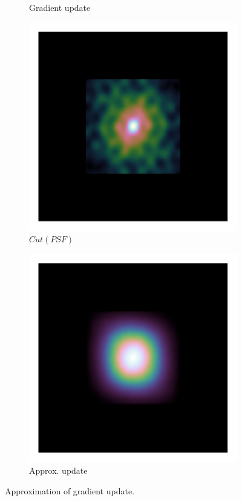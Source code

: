 \begin{figure}[h]
\begin{subfigure}[b]{0.245\linewidth}
		\caption{Gradient update}
	\end{subfigure}
	\begin{subfigure}[b]{0.245\linewidth}
		\includegraphics[width=\linewidth, clip, trim= 0.25in 0.25in 0.25in 0.25in]{./chapters/03.cd/simulated/psfCut.png}
		\caption{$Cut(PSF)$}
	\end{subfigure}
	\begin{subfigure}[b]{0.245\linewidth}
		\includegraphics[width=\linewidth, clip, trim= 0.25in 0.25in 0.25in 0.25in]{./chapters/03.cd/simulated/psfSquaredCut.png}
		\caption{Approx. update}
	\end{subfigure}
	
	\caption{Approximation of gradient update.}
	\label{gradients:update:figure}
\end{figure} 

